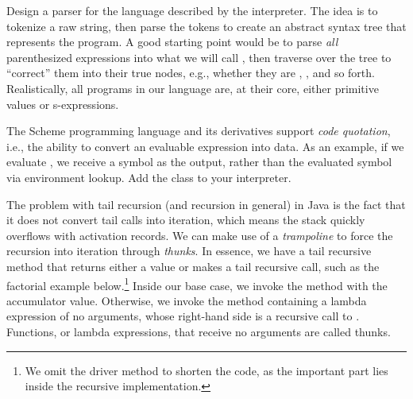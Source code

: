 Design a parser for the language described by the interpreter. The idea is to tokenize a raw string, then parse the tokens to create an abstract syntax tree that represents the program. A good starting point would be to parse \emph{all} parenthesized expressions into what we will call , then traverse over the tree to ``correct'' them into their true nodes, e.g., whether they are , , and so forth. Realistically, all programs in our language are, at their core, either primitive values or s-expressions.

The Scheme programming language and its derivatives support \emph{code quotation}, i.e., the ability to convert an evaluable expression into data. As an example, if we evaluate , we receive a symbol as the output, rather than the evaluated symbol via environment lookup. Add the  class to your interpreter.


The problem with tail recursion (and recursion in general) in Java is the fact that it does not convert tail calls into iteration, which means the stack quickly overflows with activation records. We can make use of a \emph{trampoline} to force the recursion into iteration through \emph{thunks}. In essence, we have a tail recursive method that returns either a value or makes a tail recursive call, such as the factorial example below.\footnote{We omit the driver method to shorten the code, as the important part lies inside the recursive implementation.} Inside our base case, we invoke the  method with the accumulator value. Otherwise, we invoke the  method containing a lambda expression of no arguments, whose right-hand side is a recursive call to . Functions, or lambda expressions, that receive no arguments are called thunks.


